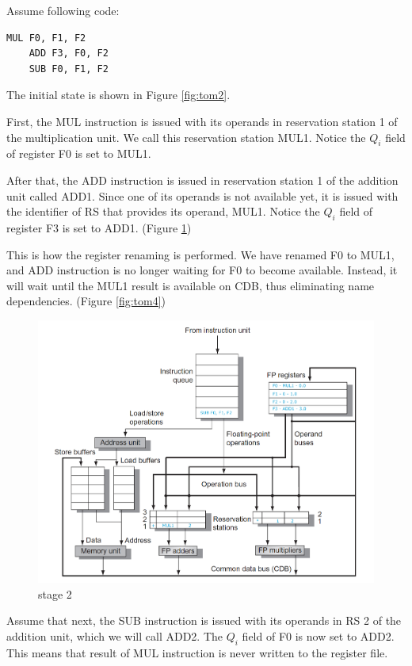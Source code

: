 \documentclass[12pt]{article}
\begin{document}
Assume following code:

\begin{lstlisting}[style=CStyle]
	MUL F0, F1, F2
	ADD F3, F0, F2
	SUB F0, F1, F2
\end{lstlisting}


The initial state is shown in Figure \ref{fig:tom2}.

First, the MUL instruction is issued with its operands in reservation station 1 of the multiplication unit. We call this reservation station MUL1. Notice the $Q_i$ field of register F0 is set to MUL1.

After that, the ADD instruction is issued in reservation station 1 of the addition unit called ADD1. Since one of its operands is not available yet, it is issued with the identifier of RS that provides its operand, MUL1. Notice the $Q_i$ field of register F3 is set to ADD1. (Figure \ref{fig:tom3})

This is how the register renaming is performed. We have renamed F0 to MUL1, and ADD instruction is no longer waiting for F0 to become available. Instead, it will wait until the MUL1 result is available on CDB, thus eliminating name dependencies. (Figure \ref{fig:tom4})

\begin{figure}[H]
	\centering
	\includegraphics[width=1\textwidth]{./images/tomas/e2.png}	
	\cprotect\caption{stage 2}
	\label{fig:tom3}
\end{figure}


Assume that next, the SUB instruction is issued with its operands in RS 2 of the addition unit, which we will call ADD2. The $Q_i$ field of F0 is now set to ADD2. This means that result of MUL instruction is never written to the register file.
\end{document}
